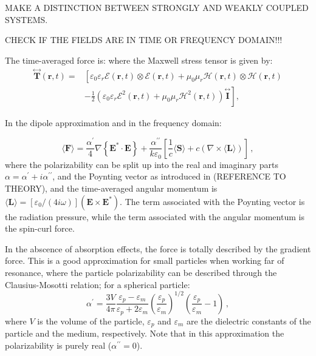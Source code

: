MAKE A DISTINCTION BETWEEN STRONGLY AND WEAKLY COUPLED SYSTEMS.

CHECK IF THE FIELDS ARE IN TIME OR FREQUENCY DOMAIN!!!

The time-averaged force is:
where the Maxwell stress tensor is given by:
\begin{equation}
    \begin{aligned}
    \stackrel{\leftrightarrow}{\mathbf{T}}(\mathbf{r}, t)= & {\left[\varepsilon_0 \varepsilon_r \mathcal{E}(\mathbf{r}, t) \otimes \mathcal{E}(\mathbf{r}, t)+\mu_0 \mu_r \mathcal{H}(\mathbf{r}, t) \otimes \mathcal{H}(\mathbf{r}, t)\right.} \\
    & \left.-\frac{1}{2}\left(\varepsilon_0 \varepsilon_r \mathcal{E}^2(\mathbf{r}, t)+\mu_0 \mu_r \mathcal{H}^2(\mathbf{r}, t)\right) \stackrel{\leftrightarrow}{\mathbf{I}}\right],
    \end{aligned}
\end{equation}

In the dipole approximation and in the frequency domain:

\begin{equation}
    \langle\mathbf{F}\rangle=\frac{\alpha^{\prime}}{4} \nabla\left\{\mathbf{E}^* \cdot \mathbf{E}\right\}
    +\frac{\alpha^{\prime \prime}}{k \varepsilon_0} \left[\frac{1}{c}\langle \mathbf{S} \rangle + c \left( \nabla \times \langle \mathbf{L} \rangle \right)\right]\,,
\end{equation}
where the polarizability can be split up into the real and imaginary parts 
$\alpha=\alpha^\prime + i \alpha^{\prime \prime}$, and the Poynting vector as introduced in 
(REFERENCE TO THEORY), and the time-averaged angular momentum is 
$\langle \mathbf{L} \rangle = [\varepsilon_0/(4 i \omega)](\mathbf{E} \times \mathbf{E}^*)$. 
The term associated with the Poynting vector is the radiation pressure, while the term associated 
with the angular momentum is the spin-curl force.

In the abscence of absorption effects, the force is totally described 
by the gradient force. This is a good approximation for small particles
when working far of resonance, where the particle polarizability can be 
described through the Clausius-Mosotti relation; for a spherical particle:
\begin{equation}
    \alpha^{\prime}=\frac{3 V}{4 \pi} \frac{\varepsilon_p-\varepsilon_m}{\varepsilon_p+2 \varepsilon_m} \left(\frac{\varepsilon_p}{\varepsilon_m}\right)^{1 / 2} \left(\frac{\varepsilon_p}{\varepsilon_m}-1\right)\,,
\end{equation}
where $V$ is the volume of the particle, $\varepsilon_p$ and $\varepsilon_m$ are the
dielectric constants of the particle and the medium, respectively. Note that in this 
approximation the polarizability is purely real ($\alpha^{\prime \prime} = 0$).

